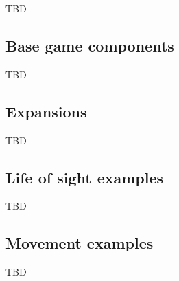 TBD

\subsection{Base game components}
TBD

\subsection{Expansions}
TBD

\subsection{Life of sight examples}
TBD

\subsection{Movement examples}
TBD